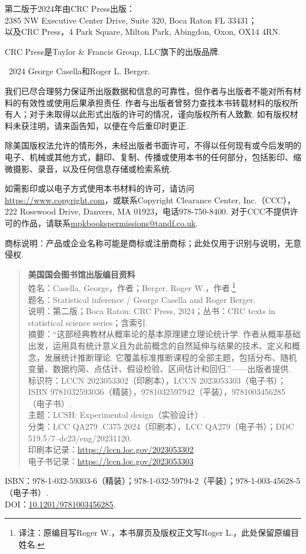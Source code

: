 第二版于2024年由CRC Press出版：\\
2385 NW Executive Center Drive, Suite 320, Boca Raton FL 33431；\\
以及CRC Press，4 Park Square, Milton Park, Abingdon, Oxon, OX14 4RN.

CRC Press是Taylor \& Francis Group, LLC旗下的出版品牌.

\textcopyright\ 2024 George Casella和Roger L. Berger.

我们已尽合理努力保证所出版数据和信息的可靠性，但作者与出版者不能对所有材料的有效性或使用后果承担责任. 作者与出版者曾努力查找本书转载材料的版权所有人；对于未取得以此形式出版的许可的情况，谨向版权所有人致歉. 如有版权材料未获注明，请来函告知，以便在今后重印时更正.

除美国版权法允许的情形外，未经出版者书面许可，不得以任何现有或今后发明的电子、机械或其他方式，翻印、复制、传播或使用本书的任何部分，包括影印、缩微摄影、录音，以及任何信息存储或检索系统.

如需影印或以电子方式使用本书材料的许可，请访问\url{https://www.copyright.com}，或联系Copyright Clearance Center, Inc.（CCC），222 Rosewood Drive, Danvers, MA 01923，电话978-750-8400. 对于CCC不提供许可的作品，请联系\href{mailto:mpkbookspermissions@tandf.co.uk}{mpkbookspermissions@tandf.co.uk}.

商标说明：产品或企业名称可能是商标或注册商标；此处仅用于识别与说明，无意侵权.

\begin{quote}\textbf{美国国会图书馆出版编目资料}\\
姓名：Casella, George，作者；Berger, Roger W.，作者.\footnote{译注：原编目写Roger W.，本书扉页及版权正文写Roger L.，此处保留原编目姓名.}\\
题名：Statistical inference / George Casella and Roger Berger.\\
说明：第二版；Boca Raton: CRC Press, 2024；丛书：CRC texts in statistical science series；含索引.\\
摘要：“这部经典教材从概率论的基本原理建立理论统计学. 作者从概率基础出发，运用具有统计意义且为此前概念的自然延伸与结果的技术、定义和概念，发展统计推断理论. 它覆盖标准推断课程的全部主题，包括分布、随机变量、数据约简、点估计、假设检验、区间估计和回归.”——出版者提供.\\
标识符：LCCN 2023053302（印刷本），LCCN 2023053303（电子书）；ISBN 9781032593036（精装），9781032597942（平装），9781003456285（电子书）.\\
主题：LCSH: Experimental design（实验设计）.\\
分类：LCC QA279 .C375 2024（印刷本），LCC QA279（电子书）；DDC 519.5/7--dc23/eng/20231120.\\
印刷本记录：\url{https://lccn.loc.gov/2023053302}\\
电子书记录：\url{https://lccn.loc.gov/2023053303}
\end{quote}
ISBN：978-1-032-59303-6（精装）；978-1-032-59794-2（平装）；978-1-003-45628-5（电子书）.\\
DOI：\href{https://doi.org/10.1201/9781003456285}{10.1201/9781003456285}.

